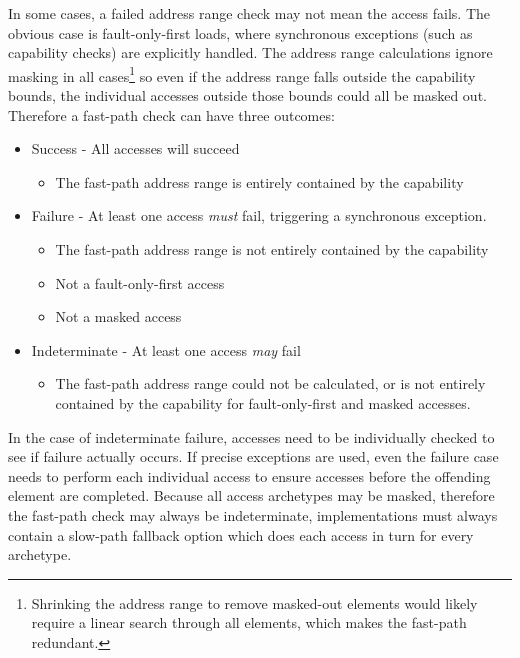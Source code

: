In some cases, a failed address range check may not mean the access fails.
The obvious case is fault-only-first loads, where synchronous exceptions (such as capability checks) are explicitly handled.
The address range calculations ignore masking in all cases\footnote{Shrinking the address range to remove masked-out elements would likely require a linear search through all elements, which makes the fast-path redundant.} so even if the address range falls outside the capability bounds, the individual accesses outside those bounds could all be masked out.
Therefore a fast-path check can have three outcomes:
\begin{itemize}
    \item Success - All accesses will succeed
    \begin{itemize}
        \item The fast-path address range is entirely contained by the capability
    \end{itemize}
    \item Failure - At least one access \emph{must} fail, triggering a synchronous exception.
    \begin{itemize}
        \item The fast-path address range is not entirely contained by the capability
        \item Not a fault-only-first access
        \item Not a masked access
    \end{itemize}
    \item Indeterminate - At least one access \emph{may} fail
    \begin{itemize}
        \item The fast-path address range could not be calculated, or is not entirely contained by the capability for fault-only-first and masked accesses.
    \end{itemize}
\end{itemize}


In the case of indeterminate failure, accesses need to be individually checked to see if failure actually occurs.
If precise exceptions are used, even the failure case needs to perform each individual access to ensure accesses before the offending element are completed.
Because all access archetypes may be masked, therefore the fast-path check may always be indeterminate, implementations must always contain a slow-path fallback option which does each access in turn for every archetype.

